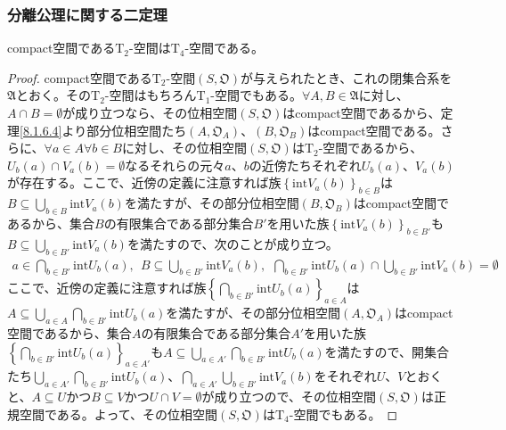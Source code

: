 \documentclass[dvipdfmx]{jsarticle}
\begin{document}
\subsubsection{分離公理に関する二定理}%
\begin{thm}\label{8.1.7.16} compact空間である$\mathrm{T}_{2}$-空間は$\mathrm{T}_{4}$-空間である。
\end{thm}
\begin{proof}
compact空間である$\mathrm{T}_{2}$-空間$\left( S,\mathfrak{O} \right)$が与えられたとき、これの閉集合系を$\mathfrak{A}$とおく。その$\mathrm{T}_{2}$-空間はもちろん$\mathrm{T}_{1}$-空間でもある。$\forall A,B \in \mathfrak{A}$に対し、$A \cap B = \emptyset$が成り立つなら、その位相空間$\left( S,\mathfrak{O} \right)$はcompact空間であるから、定理\ref{8.1.6.4}より部分位相空間たち$\left( A,\mathfrak{O}_{A} \right)$、$\left( B,\mathfrak{O}_{B} \right)$はcompact空間である。さらに、$\forall a \in A\forall b \in B$に対し、その位相空間$\left( S,\mathfrak{O} \right)$は$\mathrm{T}_{2}$-空間であるから、$U_{b}(a) \cap V_{a}(b) = \emptyset$なるそれらの元々$a$、$b$の近傍たちそれぞれ$U_{b}(a)$、$V_{a}(b)$が存在する。ここで、近傍の定義に注意すれば族$\left\{ {\mathrm{int}}{V_{a}(b)} \right\}_{b \in B}$は$B \subseteq \bigcup_{b \in B} {{\mathrm{int}}{V_{a}(b)}}$を満たすが、その部分位相空間$\left( B,\mathfrak{O}_{B} \right)$はcompact空間であるから、集合$B$の有限集合である部分集合$B'$を用いた族$\left\{ {\mathrm{int}}{V_{a}(b)} \right\}_{b \in B' }$も$B \subseteq \bigcup_{b \in B'} {{\mathrm{int}}{V_{a}(b)}}$を満たすので、次のことが成り立つ。
\begin{align*}
a \in \bigcap_{b \in B'} {{\mathrm{int}}{U_{b}(a)}},\ \ B \subseteq \bigcup_{b \in B'} {{\mathrm{int}}{V_{a}(b)}},\ \ \bigcap_{b \in B'} {{\mathrm{int}}{U_{b}(a)}} \cap \bigcup_{b \in B'} {{\mathrm{int}}{V_{a}(b)}} = \emptyset
\end{align*}
ここで、近傍の定義に注意すれば族$\left\{ \bigcap_{b \in B'} {{\mathrm{int}}{U_{b}(a)}} \right\}_{a \in A}$は$A \subseteq \bigcup_{a \in A} {\bigcap_{b \in B'} {{\mathrm{int}}{U_{b}(a)}}}$を満たすが、その部分位相空間$\left( A,\mathfrak{O}_{A} \right)$はcompact空間であるから、集合$A$の有限集合である部分集合$A'$を用いた族$\left\{ \bigcap_{b \in B'} {{\mathrm{int}}{U_{b}(a)}} \right\}_{a \in A' }$も$A \subseteq \bigcup_{a \in A' } {\bigcap_{b \in B' } {{\mathrm{int}}{U_{b}(a)}}}$を満たすので、開集合たち$\bigcup_{a \in A' } {\bigcap_{b \in B' } {{\mathrm{int}}{U_{b}(a)}}}$、$\bigcap_{a \in A' } {\bigcup_{b \in B' } {{\mathrm{int}}{V_{a}(b)}}}$をそれぞれ$U$、$V$とおくと、$A \subseteq U$かつ$B \subseteq V$かつ$U \cap V = \emptyset$が成り立つので、その位相空間$\left( S,\mathfrak{O} \right)$は正規空間である。よって、その位相空間$\left( S,\mathfrak{O} \right)$は$\mathrm{T}_{4}$-空間でもある。
\end{proof}
\end{document}
